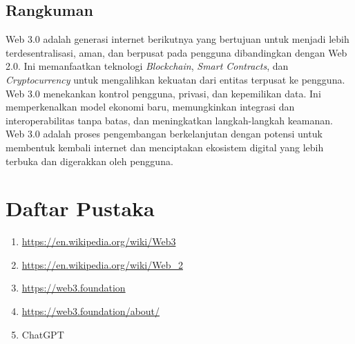 \documentclass[a4paper]{article}
\begin{document}
\subsection{Rangkuman}

Web 3.0 adalah generasi internet berikutnya yang bertujuan untuk menjadi lebih
terdesentralisasi, aman, dan berpusat pada pengguna dibandingkan dengan Web 2.0.
Ini memanfaatkan teknologi \textit{Blockchain}, \textit{Smart Contracts}, dan \textit{Cryptocurrency} untuk
mengalihkan kekuatan dari entitas terpusat ke pengguna. Web 3.0 menekankan
kontrol pengguna, privasi, dan kepemilikan data. Ini memperkenalkan model
ekonomi baru, memungkinkan integrasi dan interoperabilitas tanpa batas, dan
meningkatkan langkah-langkah keamanan. Web 3.0 adalah proses pengembangan
berkelanjutan dengan potensi untuk membentuk kembali internet dan menciptakan
ekosistem digital yang lebih terbuka dan digerakkan oleh pengguna.

\pagebreak

\section{Daftar Pustaka}

\begin{enumerate}
      \item \href{https://en.wikipedia.org/wiki/Web3}{\color{blue}https://en.wikipedia.org/wiki/Web3}
      \item \href{https://en.wikipedia.org/wiki/Web\_2}{\color{blue}https://en.wikipedia.org/wiki/Web\_2}
      \item \href{https://web3.foundation}{\color{blue}https://web3.foundation}
      \item \href{https://web3.foundation/about/}{\color{blue}https://web3.foundation/about/}
      \item ChatGPT
\end{enumerate}
\end{document}

